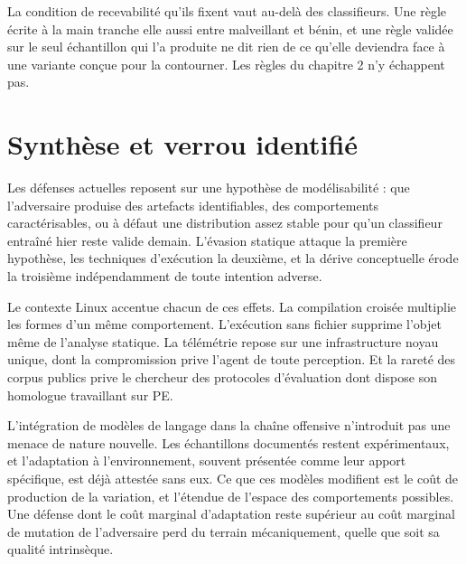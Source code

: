 La condition de recevabilité qu'ils fixent vaut au-delà des classifieurs. Une règle écrite à la main tranche elle aussi entre malveillant et bénin, et une règle validée sur le seul échantillon qui l'a produite ne dit rien de ce qu'elle deviendra face à une variante conçue pour la contourner. Les règles du chapitre 2 n'y échappent pas.

\section{Synthèse et verrou identifié}

Les défenses actuelles reposent sur une hypothèse de modélisabilité : que l'adversaire produise des artefacts identifiables, des comportements caractérisables, ou à défaut une distribution assez stable pour qu'un classifieur entraîné hier reste valide demain. L'évasion statique attaque la première hypothèse, les techniques d'exécution la deuxième, et la dérive conceptuelle érode la troisième indépendamment de toute intention adverse.

Le contexte Linux accentue chacun de ces effets. La compilation croisée multiplie les formes d'un même comportement. L'exécution sans fichier supprime l'objet même de l'analyse statique. La télémétrie repose sur une infrastructure noyau unique, dont la compromission prive l'agent de toute perception. Et la rareté des corpus publics prive le chercheur des protocoles d'évaluation dont dispose son homologue travaillant sur PE.

L'intégration de modèles de langage dans la chaîne offensive n'introduit pas une menace de nature nouvelle. Les échantillons documentés restent expérimentaux, et l'adaptation à l'environnement, souvent présentée comme leur apport spécifique, est déjà attestée sans eux. Ce que ces modèles modifient est le coût de production de la variation, et l'étendue de l'espace des comportements possibles. Une défense dont le coût marginal d'adaptation reste supérieur au coût marginal de mutation de l'adversaire perd du terrain mécaniquement, quelle que soit sa qualité intrinsèque.